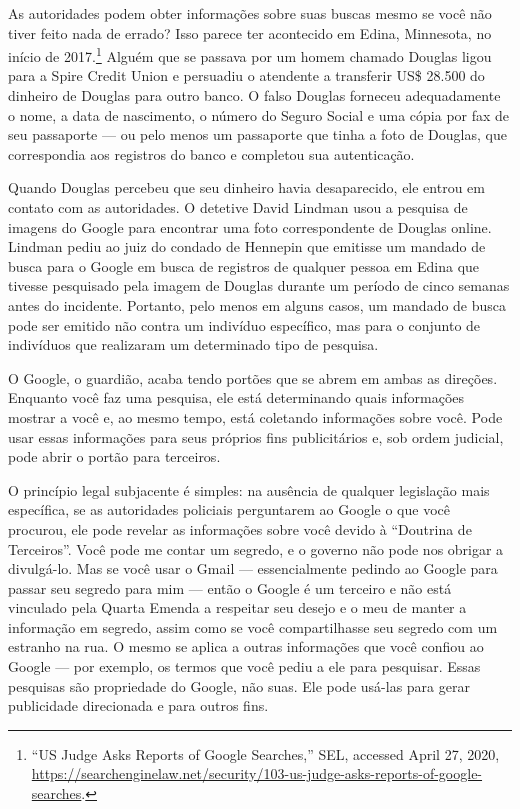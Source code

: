 \begin{tcolorbox}[title={A polícia pode buscar suas pesquisas?}]
    As autoridades podem obter informações sobre suas buscas mesmo se você não tiver feito nada
    de errado? Isso parece ter acontecido em Edina, Minnesota, no início de 2017.\footnote{``US
    Judge Asks Reports of Google Searches,'' SEL, accessed April 27, 2020,
    \url{https://searchenginelaw.net/security/103-us-judge-asks-reports-of-google-searches}.}
    Alguém que se passava por um homem chamado Douglas ligou para a Spire Credit Union e
    persuadiu o atendente a transferir US\$ 28.500 do dinheiro de Douglas para outro banco. O
    falso Douglas forneceu adequadamente o nome, a data de nascimento, o número do Seguro Social
    e uma cópia por fax de seu passaporte --- ou pelo menos um passaporte que tinha a foto de
    Douglas, que correspondia aos registros do banco e completou sua autenticação.
    
    Quando Douglas percebeu que seu dinheiro havia desaparecido, ele entrou em contato com as
    autoridades. O detetive David Lindman usou a pesquisa de imagens do Google para encontrar
    uma foto correspondente de Douglas online. Lindman pediu ao juiz do condado de Hennepin que
    emitisse um mandado de busca para o Google em busca de registros de qualquer pessoa em Edina
    que tivesse pesquisado pela imagem de Douglas durante um período de cinco semanas antes do
    incidente. Portanto, pelo menos em alguns casos, um mandado de busca pode ser emitido não
    contra um indivíduo específico, mas para o conjunto de indivíduos que realizaram um
    determinado tipo de pesquisa.
    
    O Google, o guardião, acaba tendo portões que se abrem em ambas as direções. Enquanto você
    faz uma pesquisa, ele está determinando quais informações mostrar a você e, ao mesmo tempo,
    está coletando informações sobre você. Pode usar essas informações para seus próprios fins
    publicitários e, sob ordem judicial, pode abrir o portão para terceiros.
\end{tcolorbox}

O princípio legal subjacente é simples: na ausência de qualquer legislação mais específica, se
as autoridades policiais perguntarem ao Google o que você procurou, ele pode revelar as
informações sobre você devido à ``Doutrina de Terceiros''. Você pode me contar um segredo, e o
governo não pode nos obrigar a divulgá-lo. Mas se você usar o Gmail --- essencialmente pedindo
ao Google para passar seu segredo para mim --- então o Google é um terceiro e não está vinculado
pela Quarta Emenda a respeitar seu desejo e o meu de manter a informação em segredo, assim como
se você compartilhasse seu segredo com um estranho na rua. O mesmo se aplica a outras
informações que você confiou ao Google --- por exemplo, os termos que você pediu a ele para
pesquisar. Essas pesquisas são propriedade do Google, não suas. Ele pode usá-las para gerar
publicidade direcionada e para outros fins.

